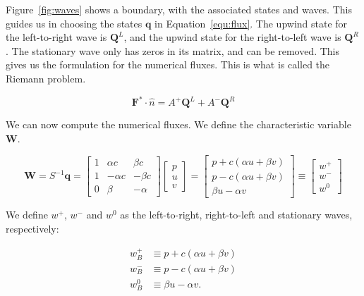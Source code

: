Figure~\ref{fig:waves} shows a boundary, with the associated states and waves. This guides us in
choosing the states \(\mathbf{q}\) in Equation~\ref{equ:flux}. The upwind state for the
left-to-right wave is \(\mathbf{Q}^L\), and the upwind state for the right-to-left wave is
\(\mathbf{Q}^R\). The stationary wave only has zeros in its matrix, and can be removed. This gives
us the formulation for the numerical fluxes. This is what is called the Riemann problem.

\begin{equation} \label{equ:flux_states}
	\mathbf{F}^* \cdot \widehat{n} = A^+ \mathbf{Q}^L + A^- \mathbf{Q}^R
\end{equation}

We can now compute the numerical fluxes. We define the characteristic variable \(\mathbf{W}\).

\begin{equation}
	\mathbf{W} = S^{-1} \mathbf{q} = 
    \begin{bmatrix}
        1 & \alpha c & \beta c \\ 
        1 & -\alpha c & -\beta c \\ 
        0 & \beta & -\alpha
	\end{bmatrix}
	\begin{bmatrix}
        p \\ 
        u \\ 
        v
	\end{bmatrix} = 
	\begin{bmatrix}
        p + c \left( \alpha u + \beta v \right) \\ 
        p - c \left( \alpha u + \beta v \right) \\ 
        \beta u - \alpha v
	\end{bmatrix} \equiv
    \begin{bmatrix}
        w^+ \\
        w^- \\
        w^0
    \end{bmatrix}   
\end{equation}

We define \(w^+\), \(w^-\) and \(w^0\) as the left-to-right, right-to-left and stationary waves,
respectively:

\begin{equation} \label{equ:waves_x}
	\begin{split}
        w_B^+ & \equiv p + c \left( \alpha u + \beta v \right) \\
        w_B^- & \equiv p - c \left( \alpha u + \beta v \right) \\
        w_B^0 & \equiv \beta u - \alpha v.
	\end{split} 
\end{equation}

